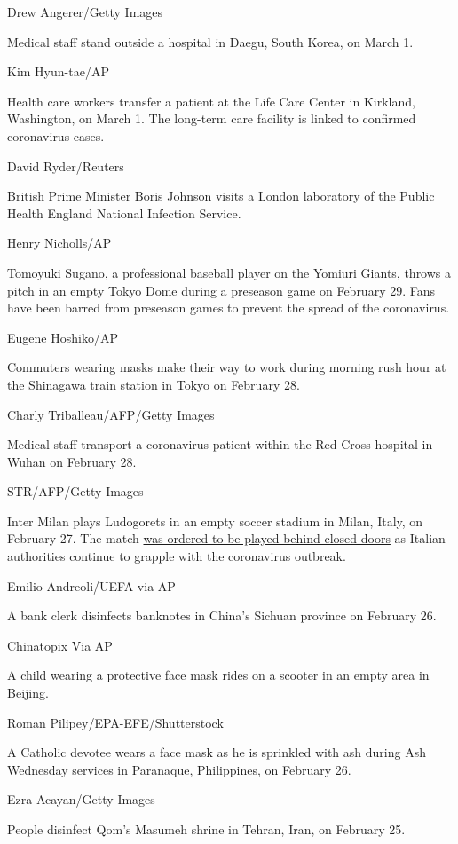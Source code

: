 Drew Angerer/Getty Images

Medical staff stand outside a hospital in Daegu, South Korea, on March
1.

Kim Hyun-tae/AP

Health care workers transfer a patient at the Life Care Center in
Kirkland, Washington, on March 1. The long-term care facility is linked
to confirmed coronavirus cases.

David Ryder/Reuters

British Prime Minister Boris Johnson visits a London laboratory of the
Public Health England National Infection Service.

Henry Nicholls/AP

Tomoyuki Sugano, a professional baseball player on the Yomiuri Giants,
throws a pitch in an empty Tokyo Dome during a preseason game on
February 29. Fans have been barred from preseason games to prevent the
spread of the coronavirus.

Eugene Hoshiko/AP

Commuters wearing masks make their way to work during morning rush hour
at the Shinagawa train station in Tokyo on February 28.

Charly Triballeau/AFP/Getty Images

Medical staff transport a coronavirus patient within the Red Cross
hospital in Wuhan on February 28.

STR/AFP/Getty Images

Inter Milan plays Ludogorets in an empty soccer stadium in Milan, Italy,
on February 27. The match
\href{https://edition.cnn.com/2020/02/28/football/inter-milan-coronavirus-ludogorets-football-spt-intl/index.html}{was
ordered to be played behind closed doors} as Italian authorities
continue to grapple with the coronavirus outbreak.

Emilio Andreoli/UEFA via AP

A bank clerk disinfects banknotes in China's Sichuan province on
February 26.

Chinatopix Via AP

A child wearing a protective face mask rides on a scooter in an empty
area in Beijing.

Roman Pilipey/EPA-EFE/Shutterstock

A Catholic devotee wears a face mask as he is sprinkled with ash during
Ash Wednesday services in Paranaque, Philippines, on February 26.

Ezra Acayan/Getty Images

People disinfect Qom's Masumeh shrine in Tehran, Iran, on February 25.

